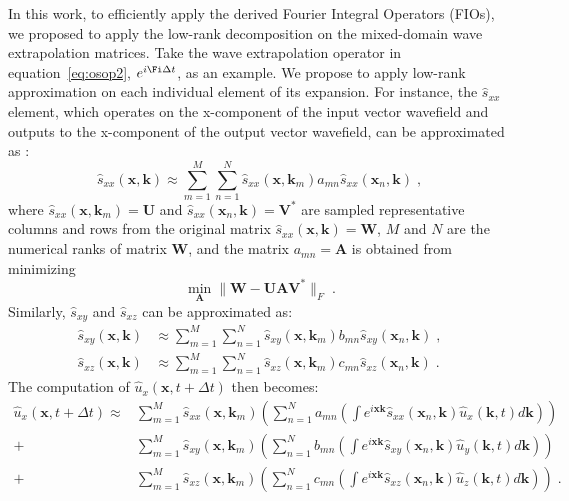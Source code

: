 In this work, to efficiently apply the derived Fourier Integral Operators (FIOs), we proposed to apply the low-rank decomposition \cite[]{lowrank} on the mixed-domain wave extrapolation matrices. Take the wave extrapolation operator in equation~\ref{eq:osop2}, $e^{i\Fi \Delta t}$, as an example. We propose to apply low-rank approximation on each individual element of its expansion. For instance, the $\hat{s}_{xx}$ element, which operates on the x-component of the input vector wavefield and outputs to the x-component of the output vector wavefield, can be approximated as \cite[]{lowrank}:
\begin{equation}
  \label{eq:lra}
  \hat{s}_{xx}(\mathbf{x},\mathbf{k})  \approx \sum\limits_{m=1}^M \sum\limits_{n=1}^N \hat{s}_{xx}(\mathbf{x},\mathbf{k}_m) a_{mn} \hat{s}_{xx}(\mathbf{x}_n,\mathbf{k})\;,
\end{equation}
where $\hat{s}_{xx}(\mathbf{x},\mathbf{k}_m)=\mathbf{U}$ and $\hat{s}_{xx}(\mathbf{x}_n,\mathbf{k})=\mathbf{V}^*$ are sampled representative columns and rows from the original matrix $\hat{s}_{xx}(\mathbf{x},\mathbf{k})=\mathbf{W}$, $M$ and $N$ are the numerical ranks of matrix $\mathbf{W}$, and the matrix $a_{mn}=\mathbf{A}$ is obtained from minimizing
\begin{equation}
\min_{\mathbf{A}} \lVert \mathbf{\mathbf{W} - \mathbf{U} \mathbf{A} \mathbf{V}^*} \rVert_F \;.
\end{equation}
Similarly, $\hat{s}_{xy}$ and $\hat{s}_{xz}$ can be approximated as:
\begin{align}
  \label{eq:lra2}
  \hat{s}_{xy}(\mathbf{x},\mathbf{k}) &\approx \sum\limits_{m=1}^M \sum\limits_{n=1}^N \hat{s}_{xy}(\mathbf{x},\mathbf{k}_m) b_{mn} \hat{s}_{xy}(\mathbf{x}_n,\mathbf{k})\;, \\
  \hat{s}_{xz}(\mathbf{x},\mathbf{k}) &\approx \sum\limits_{m=1}^M \sum\limits_{n=1}^N \hat{s}_{xz}(\mathbf{x},\mathbf{k}_m) c_{mn} \hat{s}_{xz}(\mathbf{x}_n,\mathbf{k})\;.
\end{align}
The computation of $\hat{u}_x(\mathbf{x},t+\Delta t)$ then becomes:
\begin{align}
    \label{eq:timestep}
    \hat{u}_x(\mathbf{x},t+\Delta t) 
    \approx & \sum\limits_{m=1}^M \hat{s}_{xx}(\mathbf{x},\mathbf{k}_m) \left( \sum\limits_{n=1}^N a_{mn} \left(\int e^{i \mathbf{x}\mathbf{k}} \hat{s}_{xx}(\mathbf{x}_n,\mathbf{k}) \hat{u}_x(\mathbf{k},t) d\mathbf{k} \right) \right) \\ \nonumber
    +       & \sum\limits_{m=1}^M \hat{s}_{xy}(\mathbf{x},\mathbf{k}_m) \left( \sum\limits_{n=1}^N b_{mn} \left(\int e^{i \mathbf{x}\mathbf{k}} \hat{s}_{xy}(\mathbf{x}_n,\mathbf{k}) \hat{u}_y(\mathbf{k},t) d\mathbf{k} \right) \right) \\ \nonumber
    +       & \sum\limits_{m=1}^M \hat{s}_{xz}(\mathbf{x},\mathbf{k}_m) \left( \sum\limits_{n=1}^N c_{mn} \left(\int e^{i \mathbf{x}\mathbf{k}} \hat{s}_{xz}(\mathbf{x}_n,\mathbf{k}) \hat{u}_z(\mathbf{k},t) d\mathbf{k} \right) \right) \;.
\end{align}
